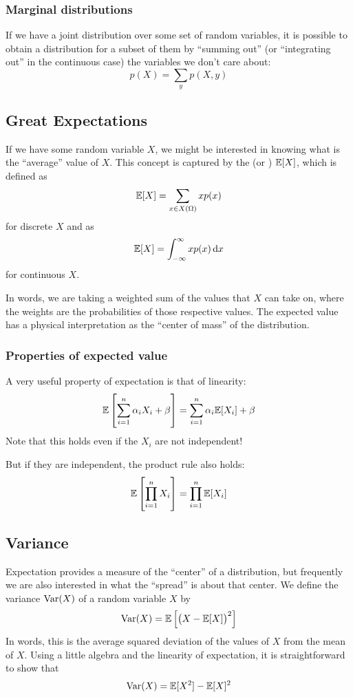 \subsubsection{Marginal distributions}
If we have a joint distribution over some set of random variables, it is possible to obtain a distribution for a subset of them by ``summing out'' (or ``integrating out'' in the continuous case) the variables we don't care about:
\[p(X) = \sum_{y} p(X, y)\]

\subsection{Great Expectations}
If we have some random variable $X$, we might be interested in knowing what is the ``average'' value of $X$.
This concept is captured by the  (or ) $\mathbb{E}[X]$, which is defined as
\[\mathbb{E}[X] = \sum_{x \in X(\Omega)} xp(x)\]
for discrete $X$ and as
\[\mathbb{E}[X] = \int_{-\infty}^\infty xp(x)\dd{x}\]
for continuous $X$.

In words, we are taking a weighted sum of the values that $X$ can take on, where the weights are the probabilities of those respective values.
The expected value has a physical interpretation as the ``center of mass'' of the distribution.

\subsubsection{Properties of expected value}
A very useful property of expectation is that of linearity:
\[\mathbb{E}\left[\sum_{i=1}^n \alpha_i X_i + \beta\right] = \sum_{i=1}^n \alpha_i \mathbb{E}[X_i] + \beta\]
Note that this holds even if the $X_i$ are not independent!

But if they are independent, the product rule also holds:
\[\mathbb{E}\left[\prod_{i=1}^n X_i\right] = \prod_{i=1}^n \mathbb{E}[X_i]\]

\subsection{Variance}
Expectation provides a measure of the ``center'' of a distribution, but frequently we are also interested in what the ``spread'' is about that center.
We define the variance $\operatorname{Var}(X)$ of a random variable $X$ by
\[\operatorname{Var}(X) = \mathbb{E}\left[\left(X - \mathbb{E}[X]\right)^2\right]\]
In words, this is the average squared deviation of the values of $X$ from the mean of $X$.
Using a little algebra and the linearity of expectation, it is straightforward to show that
\[\operatorname{Var}(X) = \mathbb{E}[X^2] - \mathbb{E}[X]^2\]

